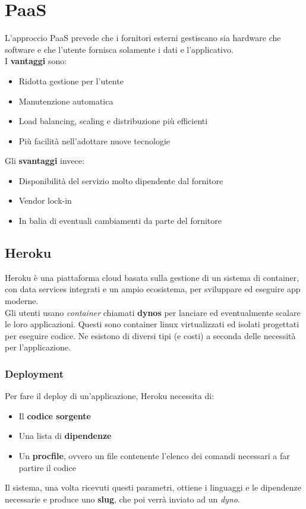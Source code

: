 \newpage
\section{PaaS}
L'approccio PaaS prevede che i fornitori esterni gestiscano sia hardware che software e che l'utente fornisca solamente i dati e l'applicativo.\\
I \textbf{vantaggi} sono:
\begin{itemize}
	\item Ridotta gestione per l'utente
	\item Manutenzione automatica
	\item Load balancing, scaling e distribuzione più efficienti
	\item Più facilità nell'adottare nuove tecnologie
\end{itemize}
Gli \textbf{svantaggi} invece:
\begin{itemize} 
	\item Disponibilità del servizio molto dipendente dal fornitore
	\item Vendor lock-in
	\item In balia di eventuali cambiamenti da parte del fornitore
\end{itemize}
\subsection{Heroku}
Heroku è una piattaforma cloud basata sulla gestione di un sistema di container, con data services integrati e un ampio ecosistema, per sviluppare ed eseguire app moderne.\\
Gli utenti usano \textit{container} chiamati \textbf{dynos} per lanciare ed eventualmente scalare le loro applicazioni. Questi sono container linux virtualizzati ed isolati progettati per eseguire codice. Ne esistono di diversi tipi (e costi) a seconda delle necessità per l'applicazione.
\subsubsection{Deployment}
Per fare il deploy di un'applicazione, Heroku necessita di:
\begin{itemize}
	\item Il \textbf{codice sorgente}
	\item Una lista di \textbf{dipendenze}
	\item Un \textbf{procfile}, ovvero un file contenente l'elenco dei comandi necessari a far partire il codice
\end{itemize}
Il sistema, una volta ricevuti questi parametri, ottiene i linguaggi e le dipendenze necessarie e produce uno \textbf{slug}, che poi verrà inviato ad un \textit{dyno}.
